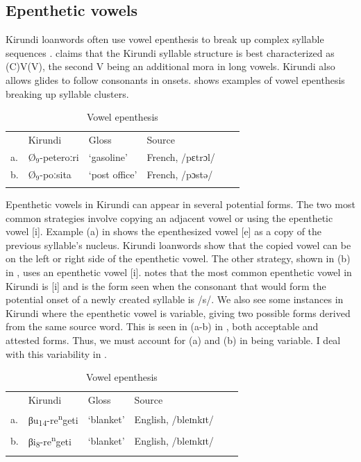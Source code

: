 \documentclass[output=paper,colorlinks,citecolor=brown,
]{langscibook}
\begin{document}
\subsection{Epenthetic vowels} \label{sec:kinchsular:epenthetic}

Kirundi loanwords often use vowel epenthesis to break up complex syllable sequences \citep{niyondagara1993kirundi}. \citet{niyondagara1993kirundi} claims that the Kirundi syllable structure is best characterized as (C)V(V), the second V being an additional mora in long vowels. Kirundi also allows glides to follow consonants in onsets.  shows examples of vowel epenthesis breaking up syllable clusters.

\begin{table}
\caption{Vowel epenthesis}
\label{tab:kinchsular:epenthesis}
\begin{tabular}{llllll}
  \lsptoprule
        & {Kirundi} & {Gloss} & {Source} \\
         a. & {Ø}$_9$-peteroːri & `gasoline' & French, /pɛtrɔl/ \\
            b. & {Ø}$_9$-poːsita & `post office' & French, /pɔstə/ \\
  \lspbottomrule
\end{tabular}
\end{table}

Epenthetic vowels in Kirundi can appear in several potential forms. The two most common strategies involve copying an adjacent vowel or using the epenthetic vowel [i]. Example (a) in  shows the epenthesized vowel [e] as a copy of the previous syllable’s nucleus. Kirundi loanwords show that the copied vowel can be on the left or right side of the epenthetic vowel. The other strategy, shown in (b) in , uses an epenthetic vowel [i]. \citet{niyondagara1993kirundi} notes that the most common epenthetic vowel in Kirundi is [i] and is the form seen when the consonant that would form the potential onset of a newly created syllable is /s/. We also see some instances in Kirundi where the epenthetic vowel is variable, giving two possible forms derived from the same source word. This is seen in (a-b) in , both acceptable and attested forms. Thus, we must account for (a) and (b) in  being variable. I deal with this variability in .

\begin{table}
\caption{Vowel epenthesis}
\label{tab:kinchsular:epenthesis2}
\begin{tabular}{llllll}
  \lsptoprule
        & {Kirundi} & {Gloss} & {Source} \\
         a. & βu\textsubscript{14}-re\textsuperscript{n}geti & `blanket' & English, /bleɪnkɪt/ \\
        b. & βi\textsubscript{8}-re\textsuperscript{n}geti & `blanket' & English, /bleɪnkɪt/  \\ 
  \lspbottomrule
\end{tabular}
\end{table}
\end{document}
